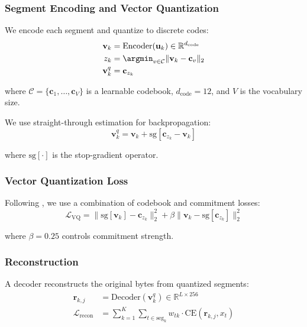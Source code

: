 \documentclass{article}
\begin{document}
\subsubsection{Segment Encoding and Vector Quantization}

We encode each segment and quantize to discrete codes:
\begin{align}
\mathbf{v}_k &= \text{Encoder}(\mathbf{u}_k) \in \mathbb{R}^{d_{\text{code}}} \\
z_k &= \argmin_{v \in \mathcal{C}} \|\mathbf{v}_k - \mathbf{c}_v\|_2 \\
\mathbf{v}_k^q &= \mathbf{c}_{z_k}
\end{align}

where $\mathcal{C} = \{\mathbf{c}_1, \ldots, \mathbf{c}_V\}$ is a learnable codebook, $d_{\text{code}}=12$, and $V$ is the vocabulary size.

We use straight-through estimation \cite{bengio2013estimating} for backpropagation:
\begin{equation}
\mathbf{v}_k^q = \mathbf{v}_k + \text{sg}[\mathbf{c}_{z_k} - \mathbf{v}_k]
\end{equation}

where $\text{sg}[\cdot]$ is the stop-gradient operator.

\subsubsection{Vector Quantization Loss}

Following \cite{van2017vqvae}, we use a combination of codebook and commitment losses:
\begin{equation}
\mathcal{L}_{\text{VQ}} = \|\text{sg}[\mathbf{v}_k] - \mathbf{c}_{z_k}\|_2^2 + \beta \|\mathbf{v}_k - \text{sg}[\mathbf{c}_{z_k}]\|_2^2
\end{equation}

where $\beta = 0.25$ controls commitment strength.

\subsubsection{Reconstruction}

A decoder reconstructs the original bytes from quantized segments:
\begin{align}
\mathbf{r}_{k,j} &= \text{Decoder}(\mathbf{v}_k^q) \in \mathbb{R}^{L \times 256} \\
\mathcal{L}_{\text{recon}} &= \sum_{k=1}^{K} \sum_{t \in \text{seg}_k} w_{tk} \cdot \text{CE}(\mathbf{r}_{k,j}, x_t)
\end{align}
\end{document}
